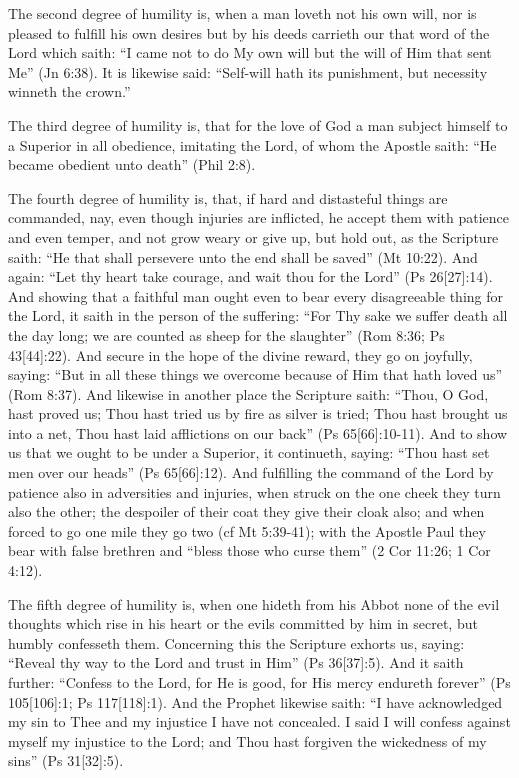 The second degree of humility is, when a man loveth not his own will, nor is pleased to fulfill his own desires but by his deeds carrieth our that word of the Lord which saith: ``I came not to do My own will but the will of Him that sent Me'' (Jn 6:38). It is likewise said: ``Self-will hath its punishment, but necessity winneth the crown.''

The third degree of humility is, that for the love of God a man subject himself to a Superior in all obedience, imitating the Lord, of whom the Apostle saith: ``He became obedient unto death'' (Phil 2:8).

The fourth degree of humility is, that, if hard and distasteful things are commanded, nay, even though injuries are inflicted, he accept them with patience and even temper, and not grow weary or give up, but hold out, as the Scripture saith: ``He that shall persevere unto the end shall be saved'' (Mt 10:22). And again: ``Let thy heart take courage, and wait thou for the Lord'' (Ps 26[27]:14). And showing that a faithful man ought even to bear every disagreeable thing for the Lord, it saith in the person of the suffering: ``For Thy sake we suffer death all the day long; we are counted as sheep for the slaughter'' (Rom 8:36; Ps 43[44]:22). And secure in the hope of the divine reward, they go on joyfully, saying: ``But in all these things we overcome because of Him that hath loved us'' (Rom 8:37). And likewise in another place the Scripture saith: ``Thou, O God, hast proved us; Thou hast tried us by fire as silver is tried; Thou hast brought us into a net, Thou hast laid afflictions on our back'' (Ps 65[66]:10-11). And to show us that we ought to be under a Superior, it continueth, saying: ``Thou hast set men over our heads'' (Ps 65[66]:12). And fulfilling the command of the Lord by patience also in adversities and injuries, when struck on the one cheek they turn also the other; the despoiler of their coat they give their cloak also; and when forced to go one mile they go two (cf Mt 5:39-41); with the Apostle Paul they bear with false brethren and ``bless those who curse them'' (2 Cor 11:26; 1 Cor 4:12).

The fifth degree of humility is, when one hideth from his Abbot none of the evil thoughts which rise in his heart or the evils committed by him in secret, but humbly confesseth them. Concerning this the Scripture exhorts us, saying: ``Reveal thy way to the Lord and trust in Him'' (Ps 36[37]:5). And it saith further: ``Confess to the Lord, for He is good, for His mercy endureth forever'' (Ps 105[106]:1; Ps 117[118]:1). And the Prophet likewise saith: ``I have acknowledged my sin to Thee and my injustice I have not concealed. I said I will confess against myself my injustice to the Lord; and Thou hast forgiven the wickedness of my sins'' (Ps 31[32]:5).

